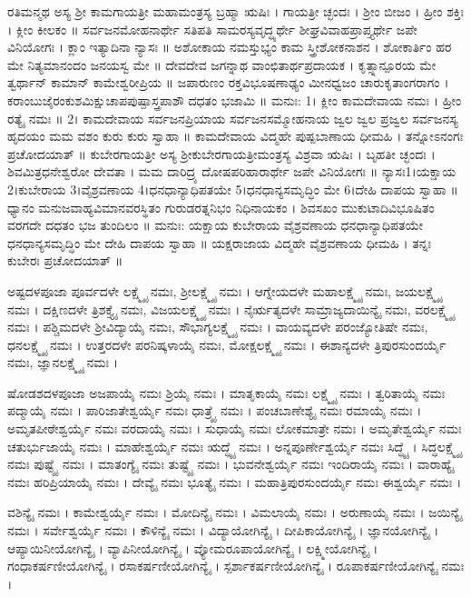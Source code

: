 ರತಿಮನ್ಮಥ
ಅಸ್ಯ ಶ್ರೀ ಕಾಮಗಾಯತ್ರೀ ಮಹಾಮಂತ್ರಸ್ಯ ಬ್ರಹ್ಮಾ ಋಷಿಃ । ಗಾಯತ್ರೀ ಚ್ಛಂದಃ । ಶ್ರೀಂ ಬೀಜಂ । ಹ್ರೀಂ ಶಕ್ತಿಃ । ಕ್ಲೀಂ ಕೀಲಕಂ ॥ ಸರ್ವಜನಮೋಹನಾರ್ಥೇ ಸತಿಪತಿ ಸಾಮರಸ್ಯವೃದ್ಧ್ಯರ್ಥೇ ಶೀಘ್ರವಿವಾಹಪ್ರಾಪ್ತ್ಯರ್ಥೇ  ಜಪೇ ವಿನಿಯೋಗಃ ।
ಕ್ಲಾಂ ಇತ್ಯಾದಿನಾ ನ್ಯಾಸಃ ॥
ಅಶೋಕಾಯ ನಮಸ್ತುಭ್ಯಂ ಕಾಮ ಸ್ತ್ರೀಶೋಕನಾಶನ । ಶೋಕಾರ್ತಿಂ ಹರ ಮೇ ನಿತ್ಯಮಾನಂದಂ ಜನಯಸ್ವ ಮೇ ॥
ದೇವದೇವ ಜಗನ್ನಾಥ ವಾಂಛಿತಾರ್ಥಪ್ರದಾಯಕ । ಕೃತ್ಸ್ನಾನ್ಪೂರಯ ಮೇ ತ್ವರ್ಥಾನ್ ಕಾಮಾನ್ ಕಾಮೇಶ್ವರೀಪ್ರಿಯ ॥
ಜಪಾರುಣಂ ರಕ್ತವಿಭೂಷಣಾಢ್ಯಂ ಮೀನಧ್ವಜಂ ಚಾರುಕೃತಾಂಗರಾಗಂ । ಕರಾಂಬುಜೈರಂಕುಶಮಿಕ್ಷುಚಾಪಪುಷ್ಪಾಸ್ತ್ರಪಾಶೌ ದಧತಂ ಭಜಾಮಿ ॥
ಮನುಃ: 1। ಕ್ಲೀಂ ಕಾಮದೇವಾಯ ನಮಃ । ಹ್ರೀಂ ರತ್ಯೈ ನಮಃ ॥
2। ಕಾಮದೇವಾಯ ಸರ್ವಜನಪ್ರಿಯಾಯ ಸರ್ವಜನಸಮ್ಮೋಹನಾಯ ಜ್ವಲ ಜ್ವಲ ಪ್ರಜ್ವಲ ಸರ್ವಜನಸ್ಯ ಹೃದಯಂ ಮಮ ವಶಂ ಕುರು ಕುರು ಸ್ವಾಹಾ ॥
ಕಾಮದೇವಾಯ ವಿದ್ಮಹೇ ಪುಷ್ಪಬಾಣಾಯ ಧೀಮಹಿ । ತನ್ನೋಽನಂಗಃ ಪ್ರಚೋದಯಾತ್ ॥
ಕುಬೇರಗಾಯತ್ರೀ
ಅಸ್ಯ ಶ್ರೀಕುಬೇರಗಾಯತ್ರೀಮಂತ್ರಸ್ಯ ವಿಶ್ರವಾ ಋಷಿಃ । ಬೃಹತೀ ಚ್ಛಂದಃ । ಶಿವಮಿತ್ರಧನೇಶ್ವರೋ ದೇವತಾ । ಮಮ ದಾರಿದ್ರ್ಯ ದೋಷಪರಿಹಾರಾರ್ಥೇ ಜಪೇ ವಿನಿಯೋಗಃ ॥
ನ್ಯಾಸಃ1।ಯಕ್ಷಾಯ 2।ಕುಬೇರಾಯ 3।ವೈಶ್ರವಣಾಯ 4।ಧನಧಾನ್ಯಾಧಿಪತಯೇ 5।ಧನಧಾನ್ಯಸಮೃದ್ಧಿಂ ಮೇ 6।ದೇಹಿ ದಾಪಯ ಸ್ವಾಹಾ ॥
ಧ್ಯಾನಂ
ಮನುಜವಾಹ್ಯವಿಮಾನವರಸ್ಥಿತಂ ಗುರುಡರತ್ನನಿಭಂ ನಿಧಿನಾಯಕಂ । ಶಿವಸಖಂ ಮುಕುಟಾದಿವಿಭೂಷಿತಂ ವರಗದೇ ದಧತಂ ಭಜ ತುಂದಿಲಂ ॥
ಮನುಃ: ಯಕ್ಷಾಯ ಕುಬೇರಾಯ ವೈಶ್ರವಣಾಯ ಧನಧಾನ್ಯಾಧಿಪತಯೇ ಧನಧಾನ್ಯಸಮೃದ್ಧಿಂ ಮೇ ದೇಹಿ ದಾಪಯ ಸ್ವಾಹಾ ॥
ಯಕ್ಷರಾಜಾಯ ವಿದ್ಮಹೇ ವೈಶ್ರವಣಾಯ ಧೀಮಹಿ । ತನ್ನಃ ಕುಬೇರಃ ಪ್ರಚೋದಯಾತ್ ॥


ಅಷ್ಟದಳಪೂಜಾ
ಪೂರ್ವದಳೇ ಲಕ್ಷ್ಮ್ಯೈ  ನಮಃ, ಶ್ರೀಲಕ್ಷ್ಮ್ಯೈ  ನಮಃ ।
ಆಗ್ನೇಯದಳೇ ಮಹಾಲಕ್ಷ್ಮ್ಯೈ  ನಮಃ, ಜಯಲಕ್ಷ್ಮ್ಯೈ  ನಮಃ ।
ದಕ್ಷಿಣದಳೇ ತ್ರಿಶಕ್ತ್ಯೈ  ನಮಃ, ವಿಜಯಲಕ್ಷ್ಮ್ಯೈ  ನಮಃ ।
ನೈರ್ಋತ್ಯದಳೇ ಸಾಮ್ರಾಜ್ಯದಾಯಿನ್ಯೈ  ನಮಃ, ವರಲಕ್ಷ್ಮ್ಯೈ  ನಮಃ ।
ಪಶ್ಚಿಮದಳೇ ಶ್ರೀವಿದ್ಯಾಯೈ  ನಮಃ, ಸೌಭಾಗ್ಯಲಕ್ಷ್ಮ್ಯೈ  ನಮಃ ।
ವಾಯವ್ಯದಳೇ ಪರಂಜ್ಯೋತಿಷೇ  ನಮಃ, ಧನಲಕ್ಷ್ಮ್ಯೈ  ನಮಃ ।
ಉತ್ತರದಳೇ ಪರನಿಷ್ಕಳಾಯೈ  ನಮಃ, ಮೋಕ್ಷಲಕ್ಷ್ಮ್ಯೈ  ನಮಃ ।
ಈಶಾನ್ಯದಳೇ ತ್ರಿಪುರಸುಂದರ್ಯೈ  ನಮಃ, ಜ್ಞಾನಲಕ್ಷ್ಮ್ಯೈ  ನಮಃ ।

ಷೋಡಶದಳಪೂಜಾ 
ಅಜಪಾಯೈ ನಮಃ ಶ್ರಿಯೈ ನಮಃ ।
ಮಾತೃಕಾಯೈ ನಮಃ ಲಕ್ಷ್ಮ್ಯೈ ನಮಃ ।
ತ್ವರಿತಾಯೈ ನಮಃ ಪದ್ಮಾಯೈ ನಮಃ ।
ಪಾರಿಜಾತೇಶ್ವರ್ಯೈ ನಮಃ ಧಾತ್ರ್ಯೈ ನಮಃ ।
ಪಂಚಬಾಣೇಶ್ಯೈ ನಮಃ ರಮಾಯೈ ನಮಃ ।
ಅಮೃತಪೀಠೇಶ್ವರ್ಯೈ ನಮಃ ವರದಾಯೈ ನಮಃ ।
ಸುಧಾಯೈ ನಮಃ ಲೋಕಮಾತ್ರೇ ನಮಃ ।
ಅಮೃತೇಶ್ವರ್ಯೈ ನಮಃ ಚತುರ್ಭುಜಾಯೈ ನಮಃ ।
ಮಾಹೇಶ್ವರ್ಯೈ ನಮಃ ಋದ್ಧ್ಯೈ ನಮಃ ।
ಅನ್ನಪೂರ್ಣೇಶ್ವರ್ಯೈ ನಮಃ ಸಿದ್ಧ್ಯೈ ।
ಸಿದ್ಧಲಕ್ಷ್ಮ್ಯೈ ನಮಃ ಪುಷ್ಟ್ಯೈ ನಮಃ ।
ಮಾತಂಗ್ಯೈ ನಮಃ ತುಷ್ಟ್ಯೈ ನಮಃ ।
ಭುವನೇಶ್ವರ್ಯೈ ನಮಃ ಇಂದಿರಾಯೈ ನಮಃ ।
ವಾರಾಹ್ಯೈ ನಮಃ ಹರಿಪ್ರಿಯಾಯೈ ನಮಃ ।
ದೇವ್ಯೈ ನಮಃ ಭೂತ್ಯೈ ನಮಃ ।
ಮಹಾತ್ರಿಪುರಸುಂದರ್ಯೈ ನಮಃ ಈಶ್ವರ್ಯೈ ನಮಃ  ।

ವಶಿನ್ಯೈ ನಮಃ । ‌ಕಾಮೇಶ್ವರ್ಯೈ ನಮಃ । ಮೋದಿನ್ಯೈ ನಮಃ । ವಿಮಲಾಯೈ ನಮಃ । ಅರುಣಾಯೈ ನಮಃ । ‌ಜಯಿನ್ಯೈ ನಮಃ । ಸರ್ವೇಶ್ವರ್ಯೈ ನಮಃ । ಕೌಳಿನ್ಯೈ ನಮಃ ।
ವಿದ್ಯಾಯೋಗಿನ್ಯೈ । ದೀಪಿಕಾಯೋಗಿನ್ಯೈ । ಜ್ಞಾನಯೋಗಿನ್ಯೈ । ಆಪ್ಯಾಯಿನೀಯೋಗಿನ್ಯೈ । ವ್ಯಾಪಿನೀಯೋಗಿನ್ಯೈ । ವ್ಯೋಮರೂಪಾಯೋಗಿನ್ಯೈ । ಲಕ್ಷ್ಮೀಯೋಗಿನ್ಯೈ । ಗಂಧಾಕರ್ಷಣೀಯೋಗಿನ್ಯೈ । ರಸಾಕರ್ಷಣೀಯೋಗಿನ್ಯೈ । ಸ್ಪರ್ಶಾಕರ್ಷಣೀಯೋಗಿನ್ಯೈ । ರೂಪಾಕರ್ಷಣೀಯೋಗಿನ್ಯೈ ನಮಃ ।

